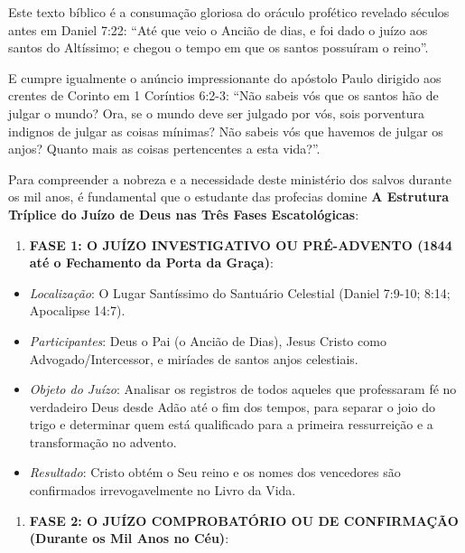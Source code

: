 \documentclass[11pt,a4paper,openany]{book}
\begin{document}
Este texto bíblico é a consumação gloriosa do oráculo profético revelado séculos antes em Daniel 7:22:
``Até que veio o Ancião de dias, e foi dado o juízo aos santos do Altíssimo; e chegou o tempo em que os santos possuíram o reino''.

E cumpre igualmente o anúncio impressionante do apóstolo Paulo dirigido aos crentes de Corinto em 1 Coríntios 6:2-3:
``Não sabeis vós que os santos hão de julgar o mundo? Ora, se o mundo deve ser julgado por vós, sois porventura indignos de julgar as coisas mínimas? Não sabeis vós que havemos de julgar os anjos? Quanto mais as coisas pertencentes a esta vida?''.

Para compreender a nobreza e a necessidade deste ministério dos salvos durante os mil anos, é fundamental que o estudante das profecias domine \textbf{A Estrutura Tríplice do Juízo de Deus nas Três Fases Escatológicas}:

\begin{enumerate}
  \item \textbf{FASE 1: O JUÍZO INVESTIGATIVO OU PRÉ-ADVENTO (1844 até o Fechamento da Porta da Graça)}:
\end{enumerate}

\begin{itemize}
  \item \textit{Localização}: O Lugar Santíssimo do Santuário Celestial (Daniel 7:9-10; 8:14; Apocalipse 14:7).
  \item \textit{Participantes}: Deus o Pai (o Ancião de Dias), Jesus Cristo como Advogado/Intercessor, e miríades de santos anjos celestiais.
  \item \textit{Objeto do Juízo}: Analisar os registros de todos aqueles que professaram fé no verdadeiro Deus desde Adão até o fim dos tempos, para separar o joio do trigo e determinar quem está qualificado para a primeira ressurreição e a transformação no advento.
  \item \textit{Resultado}: Cristo obtém o Seu reino e os nomes dos vencedores são confirmados irrevogavelmente no Livro da Vida.
\end{itemize}


\begin{enumerate}
  \item \textbf{FASE 2: O JUÍZO COMPROBATÓRIO OU DE CONFIRMAÇÃO (Durante os Mil Anos no Céu)}:
\end{enumerate}
\end{document}
